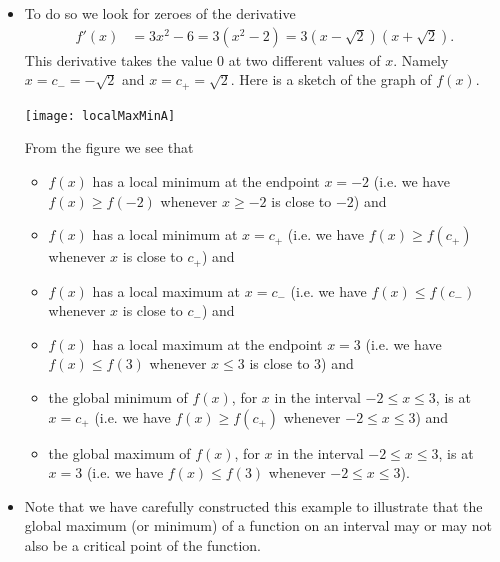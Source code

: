 \begin{eg}
\begin{itemize}
 \item To do so we look for zeroes of the derivative
\begin{align*}
  f'(x) &= 3x^2-6 = 3(x^2-2) = 3(x-\sqrt{2})(x+\sqrt{2}).
\end{align*}
This derivative takes the value $0$ at two different values of $x$. Namely
$x=c_-=-\sqrt{2}$ and $x=c_+=\sqrt{2}$. Here is a sketch of the graph of
$f(x)$.
\begin{efig}
\begin{center}
   \texttt{[image: localMaxMinA]}
\end{center}
\end{efig}
From the figure we see that
\begin{itemize}
\item $f(x)$ has a local minimum at the endpoint $x=-2$ (i.e. we have 
$f(x)\ge f(-2)$ whenever $x\ge -2$ is close to $-2$) and
\item $f(x)$ has a local minimum at $x=c_+$ (i.e. we have $f(x)\ge f(c_+)$
whenever $x$ is close to $c_+$) and
\item $f(x)$ has a local maximum at $x=c_-$ (i.e. we have $f(x)\le f(c_-)$
whenever $x$ is close to $c_-$) and
\item $f(x)$ has a local maximum at the endpoint $x=3$ (i.e. we have 
$f(x)\le f(3)$ whenever $x\le 3$ is close to $3$) and
\item the global minimum of $f(x)$, for $x$ in the interval $-2\le x\le 3$, is
at $x=c_+$ (i.e. we have $f(x)\ge f(c_+)$ whenever $-2\le x\le 3$) and
\item the global maximum of $f(x)$, for $x$ in the interval $-2\le x\le 3$, is
at $x=3$ (i.e. we have $f(x)\le f(3)$ whenever $-2\le x\le 3$).
\end{itemize}
\item Note that we have carefully constructed this example to illustrate that
the global maximum (or minimum) of a function on an interval may or may not also
be a critical point of the function.
\end{itemize}

\end{eg}

